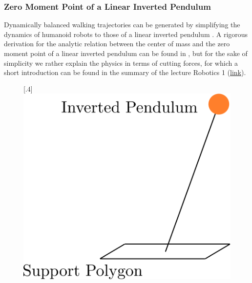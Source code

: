 \subsubsection{Zero Moment Point of a Linear Inverted Pendulum}
Dynamically balanced walking trajectories can be generated by simplifying the dynamics of humanoid robots to those of a linear inverted pendulum \cite{kajita2003biped}. A rigorous derivation for the analytic relation between the center of mass and the zero moment point of a linear inverted pendulum can be found in \cite{kajita2014introduction}, but for the sake of simplicity we rather explain the physics in terms of cutting forces, for which a short introduction can be found in the summary of the lecture Robotics 1 (\href{https://drive.google.com/file/d/1aN1ujXTOlHzO2kLPK7TQRkWfdY-pGzUF/view}{link}). 
\begin{figure}[h]
	\centering
	\subcaptionbox{}%
	[.4\linewidth]{\includegraphics[scale=.3]{chapters/03_background/img/inverted_pendulum.png}}
	\subcaptionbox{}%

\end{figure}
